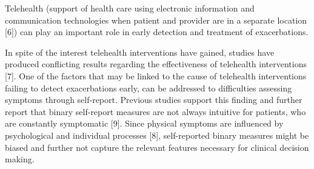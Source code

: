 %
%

Telehealth (support of health care using electronic information and communication technologies when patient and provider are in a separate location [6]) can play an important role in early detection and treatment of exacerbations. 

In spite of the interest telehealth interventions have gained, studies have produced conflicting results regarding the effectiveness of telehealth interventions [7]. One of the factors that may be linked to the cause of telehealth interventions failing to detect exacerbations early, can be addressed to difficulties assessing symptoms through self-report. Previous studies support this finding and further report that binary self-report measures are not always intuitive for patients, who are constantly symptomatic [9]. Since physical symptoms are influenced by psychological and individual processes [8], self-reported binary measures might be biased and further not capture the relevant features necessary for clinical decision making.  


%
%

%
%


